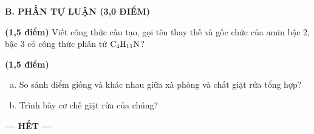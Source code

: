 \documentclass[12pt,a4paper]{article}
\begin{document}
\vspace{0.4cm}
\noindent
\textbf{B. PHẦN TỰ LUẬN (3,0 ĐIỂM)}

\setcounter{ex}{0}

\begin{ex}
\textbf{(1,5 điểm)} Viết công thức cấu tạo, gọi tên thay thế và gốc chức của amin bậc 2, bậc 3 có công thức phân tử $\ce{C4H11N}$?
\loigiai{}
\end{ex}

\begin{ex}
\textbf{(1,5 điểm)}
\begin{enumerate}[a.]
	\item So sánh điểm giống và khác nhau giữa xà phòng và chất giặt rửa tổng hợp?
	\item Trình bày cơ chế giặt rửa của chúng?
\end{enumerate}
\loigiai{}
\end{ex}

\begin{center}
\textbf{--- HẾT ---}
\end{center}
\end{document}
